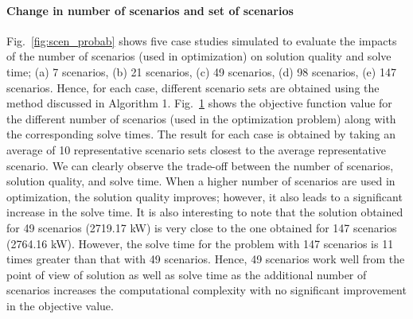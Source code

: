 \paragraph{Change in number of scenarios and set of scenarios} 
Fig.~\ref{fig:scen_probab} shows five case studies simulated to evaluate the impacts of the number of scenarios (used in optimization) on solution quality and solve time; (a) 7 scenarios, (b) 21 scenarios, (c) 49 scenarios, (d) 98 scenarios, (e) 147 scenarios.  Hence, for each case, different scenario sets are obtained using the method discussed in Algorithm 1. Fig.~\ref{fig:scen_vs_time} shows the objective function value for the different number of scenarios (used in the optimization problem) along with the corresponding solve times. The result for each case is obtained by taking an average of 10 representative scenario sets closest to the average representative scenario. We can clearly observe the trade-off between the number of scenarios, solution quality, and solve time. When a higher number of scenarios are used in optimization, the solution quality improves; however, it also leads to a significant increase in the solve time. It is also interesting to note that the solution obtained for 49 scenarios (2719.17 kW) is very close to the one obtained for 147 scenarios (2764.16 kW). However, the solve time for the problem with 147 scenarios is 11 times greater than that with 49 scenarios. Hence, 49 scenarios work well from the point of view of solution as well as solve time as the additional number of scenarios increases the computational complexity with no significant improvement in the objective value.

\begin{figure}[!t!]
    \centering
    \caption{}
    \label{fig:scen_vs_time}
\end{figure}

\begin{figure}[t]
    \centering
    \caption{}
    \label{fig:scen_sets}
\end{figure}
